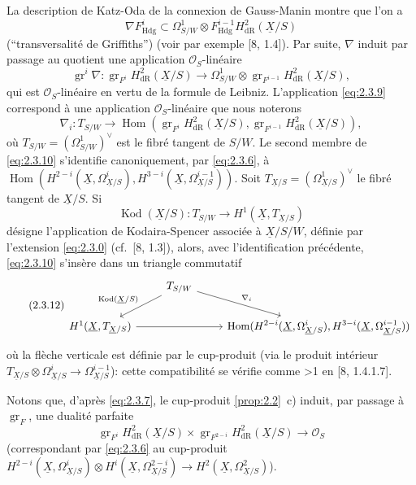 \documentclass[10pt]{article}
\DeclareMathOperator{\Hom}{Hom}
\DeclareMathOperator{\gr}{gr}
\DeclareMathOperator{\Kod}{Kod}
\newcommand{\Hdg}{\mathrm{Hdg}}
\newcommand{\UX}{\underline{X}}
\newcommand{\DPage}[2]{\ifnum#1>1\clearpage\fi\setcounter{page}{#2}}
\begin{document}
La description de Katz-Oda de la connexion de Gauss-Manin montre que l'on a
\begin{equation}\tag{2.3.8}\label{eq:2.3.8}
\nabla F^i_{\Hdg} \subset \Omega^1_{S/W} \otimes F^{i-1}_{\Hdg} H^2_{\mathrm{dR}}(\UX/S)
\end{equation}
(``transversalité de Griffiths'') (voir par exemple [8, 1.4]). Par suite, $\nabla$ induit par passage au quotient une application $\mathcal{O}_S$-linéaire
\begin{equation}\tag{2.3.9}\label{eq:2.3.9}
\gr^i \nabla: \gr_{F^i} H^2_{\mathrm{dR}}(\UX/S) \to \Omega^1_{S/W} \otimes \gr_{F^{i-1}} H^2_{\mathrm{dR}}(\UX/S),
\end{equation}
qui est $\mathcal{O}_S$-linéaire en vertu de la formule de Leibniz. L'application \eqref{eq:2.3.9} correspond à une application $\mathcal{O}_S$-linéaire que nous noterons
\begin{equation}\tag{2.3.10}\label{eq:2.3.10}
\nabla_i: T_{S/W} \to \Hom(\gr_{F^i} H^2_{\mathrm{dR}}(\UX/S), \gr_{F^{i-1}} H^2_{\mathrm{dR}}(\UX/S)),
\end{equation}
où $T_{S/W} = (\Omega^1_{S/W})^{\vee}$ est le fibré tangent de $S/W$. Le second membre de \eqref{eq:2.3.10} s'identifie canoniquement, par \eqref{eq:2.3.6}, à $\Hom(H^{2-i}(\UX, \Omega^i_{\UX/S}), H^{3-i}(\UX, \Omega^{i-1}_{\UX/S}))$. Soit $T_{\UX/S} = (\Omega^1_{\UX/S})^{\vee}$ le fibré tangent de $\UX/S$. Si
\begin{equation}\tag{2.3.11}\label{eq:2.3.11}
\Kod(\UX/S): T_{S/W} \to H^1(\UX, T_{\UX/S})
\end{equation}
désigne l'application de Kodaira-Spencer associée à $\UX/S/W$, définie par l'extension \eqref{eq:2.3.0} (cf.~[8, 1.3]), alors, avec l'identification précédente, \eqref{eq:2.3.10} s'insère dans un triangle commutatif
\begin{equation}\tag{2.3.12}\label{eq:2.3.12}
\begin{tikzcd}
& T_{S/W} \arrow[dl, "{\Kod(\UX/S)}"'] \arrow[dr, "{\nabla_i}"] & \\
H^1(\UX, T_{\UX/S}) \arrow[rr] & & \displaystyle\Hom(H^{2-i}(\UX, \Omega^i_{\UX/S}), H^{3-i}(\UX, \Omega^{i-1}_{\UX/S}))
\end{tikzcd}
\end{equation}
où la flèche verticale est définie par le cup-produit (via le produit intérieur $T_{\UX/S} \otimes \Omega^i_{\UX/S} \to \Omega^{i-1}_{\UX/S}$): cette compatibilité se vérifie comme
\DPage{11}{68}
en [8, 1.4.1.7].

Notons que, d'après \eqref{eq:2.3.7}, le cup-produit \ref{prop:2.2}~c) induit, par passage à $\gr_F$, une dualité parfaite
\begin{equation}\tag{2.3.13}\label{eq:2.3.13}
\gr_{F^i} H^2_{\mathrm{dR}}(\UX/S) \times \gr_{F^{2-i}} H^2_{\mathrm{dR}}(\UX/S) \to \mathcal{O}_S
\end{equation}
(correspondant par \eqref{eq:2.3.6} au cup-produit $H^{2-i}(\UX, \Omega^i_{\UX/S}) \otimes H^i(\UX, \Omega^{2-i}_{\UX/S}) \to H^2(\UX, \Omega^2_{\UX/S})$).
\end{document}
